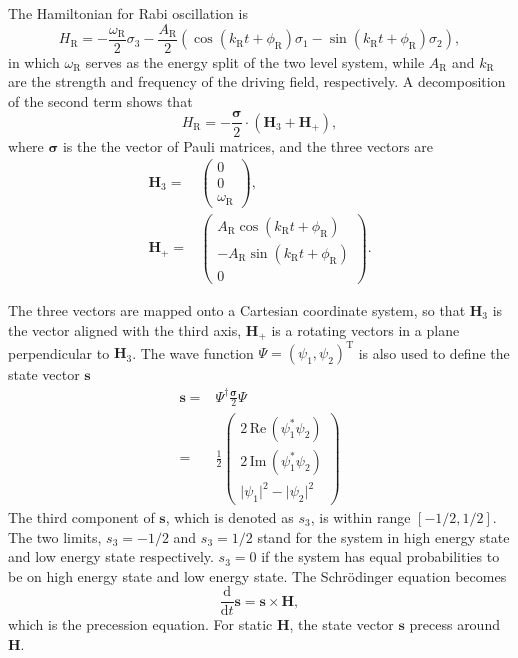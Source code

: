 \documentclass[%
reprint,
 amsmath,amssymb,
 prd,
]{revtex4-1}
\begin{document}
The Hamiltonian for Rabi oscillation is
\begin{equation}
    H_{\mathrm R} = -\frac{\omega_{\mathrm R}}{2}\sigma_3 - \frac{A_{\mathrm{R}} }{2}  \left( \cos(k_{\mathrm{R}} t +\phi_{\mathrm{R}})\sigma_1  - \sin(k_{\mathrm{R}} t +\phi_{\mathrm{R}}) \sigma_2\right),
    \label{rabi-oscillation-single-perturbation}
\end{equation}
in which $\omega_{\mathrm R}$ serves as the energy split of the two level system, while $A_{\mathrm{R}}$ and $k_{\mathrm{R}}$ are the strength and frequency of the driving field, respectively. A decomposition of the second term shows that
\begin{equation*}
H_{\mathrm R} 
= - \frac{\boldsymbol{\sigma}}{2} \cdot (\mathbf{H}_3 + \mathbf{H}_+ ) ,
\end{equation*}
where $\boldsymbol{\sigma}$ is the the vector of Pauli matrices, and the three vectors are
\begin{align}
    \mathbf{H}_3 = & \begin{pmatrix}
    0 \\ 0 \\ \omega_{\mathrm R}
    \end{pmatrix}, \\
    \mathbf{H}_+ = & \begin{pmatrix}
    A_{\mathrm{R}} \cos(k_{\mathrm{R}} t +\phi_{\mathrm{R}}) \\
    - A_{\mathrm{R}} \sin(k_{\mathrm{R}} t +\phi_{\mathrm{R}}) \\
    0
    \end{pmatrix}.
\end{align}

The three vectors are mapped onto a Cartesian coordinate system, so that $\mathbf{H}_3$ is the vector aligned with the third axis, $\mathbf{H}_+$ is a rotating vectors in a plane perpendicular to $\mathbf{H}_3$. The wave function $\Psi=(\psi_1,\psi_2)^{\mathrm{T}}$ is also used to define the state vector $\mathbf{s}$
\begin{align}
    \mathbf{s} =& \Psi^\dagger \frac{\boldsymbol{\sigma}}{2}\Psi \\
    =& \frac{1}{2}\begin{pmatrix}
    2\,\mathrm{Re}\,(\psi_1^* \psi_2) \\
    2\,\mathrm{Im}\,(\psi_1^*\psi_2) \\
    \lvert \psi_1 \rvert^2 - \lvert \psi_2 \rvert^2
    \end{pmatrix}
\end{align}
The third component of $\mathbf{s}$, which is denoted as $s_3$, is within range $[-1/2,1/2]$. The two limits, $s_3=-1/2$ and $s_3=1/2$ stand for the system in high energy state and low energy state respectively. $s_3=0$ if the system has equal probabilities to be on high energy state and low energy state. The Schr\"odinger equation becomes
\begin{equation}
\frac{\mathrm{d}}{\mathrm{d} t } \mathbf{s} = \mathbf{s} \times \mathbf{H},
\end{equation}
which is the precession equation. For static $\mathbf{H}$, the state vector $\mathbf{s}$ precess around $\mathbf{H}$. 
\end{document}
